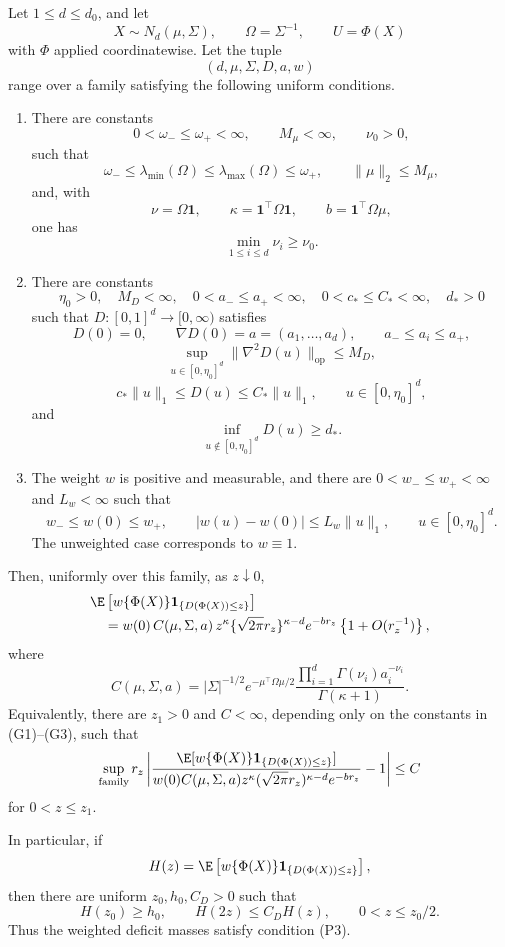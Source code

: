 \begin{theorem}
\label{thm:uniform-gaussian-corner}
Let \(1\le d\le d_0\), and let
\[
 X\sim N_d(\mu,\Sigma),
 \qquad
 \Omega=\Sigma^{-1},
 \qquad
 U=\Phi(X)
\]
with \(\Phi\) applied coordinatewise. Let the tuple
\[
 (d,\mu,\Sigma,D,a,w)
\]
range over a family satisfying the following uniform conditions.

\begin{enumerate}
\item[(G1)]
There are constants
\[
 0<\omega_-\le\omega_+<\infty,
 \qquad M_\mu<\infty,
 \qquad \nu_0>0,
\]
such that
\[
 \omega_-\le\lambda_{\min}(\Omega)
 \le\lambda_{\max}(\Omega)\le\omega_+,
 \qquad
 \|\mu\|_2\le M_\mu,
\]
and, with
\[
 \nu=\Omega\mathbf 1,
 \qquad
 \kappa=\mathbf 1^\top\Omega\mathbf 1,
 \qquad
 b=\mathbf 1^\top\Omega\mu,
\]
one has
\[
 \min_{1\le i\le d}\nu_i\ge\nu_0.
\]

\item[(G2)]
There are constants
\[
 \eta_0>0,\quad
 M_D<\infty,\quad
 0<a_-\le a_+<\infty,\quad
 0<c_*\le C_*<\infty,\quad
 d_*>0
\]
such that \(D:[0,1]^d\to[0,\infty)\) satisfies
\[
 D(0)=0,\qquad
 \nabla D(0)=a=(a_1,\ldots,a_d),
 \qquad
 a_-\le a_i\le a_+,
\]
\[
 \sup_{u\in[0,\eta_0]^d}
 \|\nabla^2D(u)\|_{\mathrm{op}}\le M_D,
\]
\[
 c_*\|u\|_1\le D(u)\le C_*\|u\|_1,
 \qquad u\in[0,\eta_0]^d,
\]
and
\[
 \inf_{u\notin[0,\eta_0]^d}D(u)\ge d_*.
\]

\item[(G3)]
The weight \(w\) is positive and measurable, and there are
\(0<w_-\le w_+<\infty\) and \(L_w<\infty\) such that
\[
 w_-\le w(0)\le w_+,
 \qquad
 |w(u)-w(0)|\le L_w\|u\|_1,
 \qquad u\in[0,\eta_0]^d.
\]
The unweighted case corresponds to \(w\equiv1\).
\end{enumerate}

Then, uniformly over this family, as \(z\downarrow0\),
\begin{align}
 &\E\left[
   w\{\Phi(X)\}
   \mathbf 1_{\{D(\Phi(X))\le z\}}
 \right]
 \nonumber\\
 &\quad=
 w(0)\,C(\mu,\Sigma,a)\,
 z^\kappa
 \{\sqrt{2\pi}r_z\}^{\kappa-d}
 e^{-br_z}
 \left\{1+O(r_z^{-1})\right\},
 \label{eq:uniform-corner-main}
\end{align}
where
\begin{equation}
 C(\mu,\Sigma,a)
 =
 |\Sigma|^{-1/2}
 e^{-\mu^\top\Omega\mu/2}
 \frac{\prod_{i=1}^d\Gamma(\nu_i)a_i^{-\nu_i}}
      {\Gamma(\kappa+1)}.
 \label{eq:uniform-corner-constant}
\end{equation}
Equivalently, there are \(z_1>0\) and \(C<\infty\), depending
only on the constants in (G1)--(G3), such that
\[
 \sup_{\text{family}}
 r_z
 \left|
 \frac{
  \E[w\{\Phi(X)\}\mathbf 1_{\{D(\Phi(X))\le z\}}]
 }{
  w(0)C(\mu,\Sigma,a)
  z^\kappa(\sqrt{2\pi}r_z)^{\kappa-d}e^{-br_z}
 }-1
 \right|
 \le C
\]
for \(0<z\le z_1\).

In particular, if
\[
 H(z)
 =
 \E\left[
  w\{\Phi(X)\}\mathbf 1_{\{D(\Phi(X))\le z\}}
 \right],
\]
then there are uniform \(z_0,h_0,C_D>0\) such that
\[
 H(z_0)\ge h_0,
 \qquad
 H(2z)\le C_DH(z),
 \qquad 0<z\le z_0/2.
\]
Thus the weighted deficit masses satisfy condition {\rm(P3)}.
\end{theorem}

